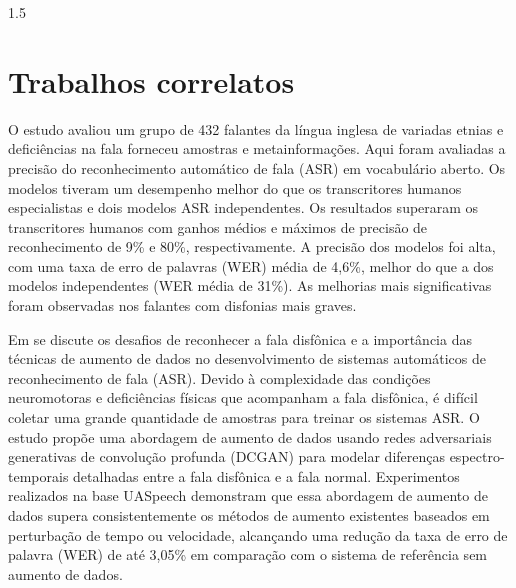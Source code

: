 \documentclass[a4paper,12pt,openright,oneside]{book}
\newenvironment{myenv}[1]
  {\begin{spacing}{#1}}
  {\end{spacing}}
\begin{document}
\begin{myenv}{1.5}

		\section{Trabalhos correlatos}
		
			\par O estudo \cite{WOS:000841879504172} avaliou um grupo de 432 falantes da língua inglesa de variadas etnias e deficiências na fala forneceu amostras e metainformações. Aqui foram avaliadas a precisão do reconhecimento automático de fala (ASR) em vocabulário aberto. Os modelos tiveram um desempenho melhor do que os transcritores humanos especialistas e dois modelos ASR independentes. Os resultados superaram os transcritores humanos com ganhos médios e máximos de precisão de reconhecimento de 9\% e 80\%, respectivamente. A precisão dos modelos foi alta, com uma taxa de erro de palavras (WER) média de 4,6\%, melhor do que a dos modelos independentes (WER média de 31\%). As melhorias mais significativas foram observadas nos falantes com disfonias mais graves.\newline
			
			\par  Em \cite{jin21_interspeech} se discute os desafios de reconhecer a fala disfônica e a importância das técnicas de aumento de dados no desenvolvimento de sistemas automáticos de reconhecimento de fala (ASR). Devido à complexidade das condições neuromotoras e deficiências físicas que acompanham a fala disfônica, é difícil coletar uma grande quantidade de amostras para treinar os sistemas ASR. O estudo propõe uma abordagem de aumento de dados usando redes adversariais generativas de convolução profunda (DCGAN) para modelar diferenças espectro-temporais detalhadas entre a fala disfônica e a fala normal. Experimentos realizados na base UASpeech demonstram que essa abordagem de aumento de dados supera consistentemente os métodos de aumento existentes baseados em perturbação de tempo ou velocidade, alcançando uma redução da taxa de erro de palavra (WER) de até 3,05\% em comparação com o sistema de referência sem aumento de dados.\newline
			

\end{myenv}
\end{document}
